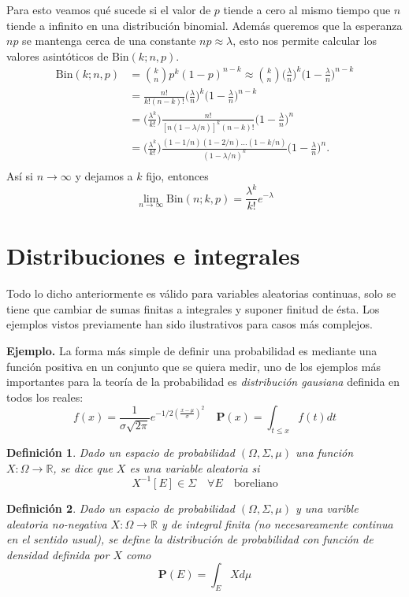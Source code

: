 \documentclass[letterpaper]{book}
\newtheorem{def.}{Definici\'on}[section]
\newcommand{\prob}{\textbf{P}}
\newcommand{\exe}{{\newline \noindent \sc \textbf{Ejemplo. }}}
\newcommand{\om}{\ensuremath{\Omega}}
\newcommand{\sig}{\ensuremath{\Sigma}}
\newcommand{\re}{\ensuremath{\mathbb R }}
\begin{document}
Para esto veamos qué sucede si el valor de \(p\) tiende a cero al mismo tiempo que \(n\) tiende a infinito en una distribución binomial. Además queremos que la esperanza \(np\) se mantenga cerca de una constante \(np\approx\lambda\), esto nos permite calcular los valores asintóticos de \(\textrm{Bin}(k;n,p)\). 
\begin{align*}
\textrm{Bin}(k;n,p)&={k\choose n}p^k(1-p)^{n-k}\approx{k\choose n}\Big(\frac{\lambda}{n}\Big)^k\Big(1-\frac{\lambda}{n}\Big)^{n-k}\\
&=\frac{n!}{k!(n-k)!}\Big(\frac{\lambda}{n}\Big)^k\Big(1-\frac{\lambda}{n}\Big)^{n-k}\\
&= \Big(\frac{\lambda^k}{k!}\Big)\frac{n!}{[n(1-\lambda/n)]^k(n-k)!}\Big(1-\frac{\lambda}{n}\Big)^{n}\\
&=\Big(\frac{\lambda^k}{k!}\Big)\frac{(1-1/n)(1-2/n)\dots(1-k/n)}{(1-\lambda/n)^k}\Big(1-\frac{\lambda}{n}\Big)^{n}.\\
\end{align*}
\noindent Así si \(n\rightarrow\infty\) y dejamos a \(k\) fijo, entonces
\[
\lim_{n\rightarrow\infty}\textrm{Bin}(n;k,p)=\frac{\lambda^k}{k!}e^{-\lambda}
\]
\section{Distribuciones e integrales}
\label{sec:org3fb7f51}

\noindent Todo lo dicho anteriormente es válido para variables aleatorias continuas, solo se tiene que cambiar de sumas finitas a integrales y suponer finitud de ésta. Los ejemplos vistos previamente han sido ilustrativos para casos más complejos.

\exe La forma más simple de definir una probabilidad es mediante una función positiva en un conjunto que se quiera medir, uno de los ejemplos más importantes para la teoría de la probabilidad es \emph{distribución gausiana} definida en todos los reales:
\[
    f(x)=\frac{1}{\sigma\sqrt{2\pi}}e^{-1/2(\frac{x-\mu}{\sigma})^2}\quad \prob(x)=\int_{t\leq x}f(t)dt
\]

\begin{def.}
Dado un espacio de probabilidad \((\om,\sig,\mu)\) una función \(X:\om\rightarrow \re\), se dice que \(X\) es una variable aleatoria si
\[
    X^{-1}[E]\in\sig\quad\forall E \quad\text{boreliano}
\]
\end{def.}
\begin{def.}
Dado un espacio de probabilidad \((\om,\sig,\mu)\) y una varible aleatoria no-negativa \(X:\om\rightarrow \re\) y de integral finita (no necesareamente continua en el sentido usual), se define la \emph{distribución de probabilidad} con función de densidad definida por \(X\) como
\[
\prob(E)=\int_E Xd\mu
\]
\end{def.}
\end{document}
